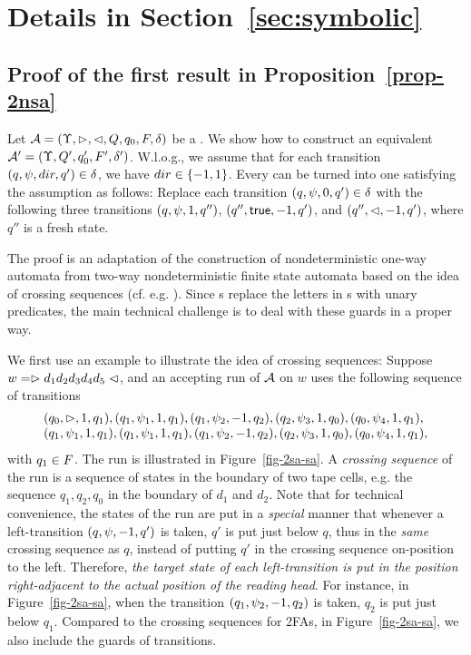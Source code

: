 \section{Details in Section~\ref{sec:symbolic}}\label{app-sym}

\subsection{Proof of the first result in Proposition~\ref{prop-2nsa}}

Let $\mathcal{A} = (\Upsilon, \vartriangleright, \vartriangleleft, Q, q_0, F, \delta)$ be a \SSA. We show how to construct an equivalent \SA{} $\mathcal{A}' =  (\Upsilon, Q', q'_0, F', \delta')$.
W.l.o.g., we assume that for each transition $(q, \psi, dir, q') \in \delta$, we have $dir \in \{-1,1\}$. Every \SSA{} can be turned into one satisfying the assumption as follows: Replace each transition $(q, \psi, 0, q') \in \delta$ with the following three transitions $(q, \psi, 1, q'')$, $(q'', \mathsf{true}, -1, q')$, and $(q'', \vartriangleleft, -1, q')$, where $q''$ is a fresh state.

The proof is an adaptation of the  construction of nondeterministic one-way automata from two-way nondeterministic finite state automata based on the idea of crossing sequences (cf. e.g. \cite{HU79}). Since \SSA{}s replace the letters in \FFA{}s with unary predicates, the main technical challenge is to deal with these guards in a proper way.

We first use an example to illustrate the idea of crossing sequences: Suppose $w = \vartriangleright d_1 d_2 d_3 d_4 d_5\vartriangleleft$, and an accepting run of $\mathcal{A}$ on $w$ uses the following sequence of transitions 
\[
\begin{array}{l}
(q_0, \vartriangleright, 1, q_1), (q_1, \psi_1, 1, q_1), (q_1, \psi_2, -1, q_2), (q_2, \psi_3, 1, q_0), (q_0, \psi_4, 1, q_1), \\
(q_1, \psi_1, 1, q_1), (q_1, \psi_1, 1, q_1), (q_1, \psi_2, -1, q_2), (q_2, \psi_3, 1, q_0), (q_0, \psi_4, 1, q_1),
\end{array}
\] 
with $q_1 \in F$.
The run is illustrated in Figure~\ref{fig-2sa-sa}. A \emph{crossing sequence} of the run is a sequence of states in the boundary of two tape cells, e.g. the sequence $q_1, q_2, q_0$ in the boundary of $d_1$ and $d_2$. Note that for technical convenience, the states of the run are put in a \emph{special} manner that whenever a left-transition $(q, \psi, -1, q')$ is taken, $q'$ is put just below $q$, thus in the \emph{same} crossing sequence as $q$, instead of putting $q'$ in the crossing sequence on-position to the left. Therefore, 
\emph{the target state of each left-transition is put in the position right-adjacent to the actual position of the reading head}.
For instance, in Figure~\ref{fig-2sa-sa}, when the transition $(q_1, \psi_2, -1, q_2)$ is taken, $q_2$ is put just below $q_1$. Compared to the crossing sequences for 2FAs, in Figure~\ref{fig-2sa-sa}, we also include the guards of transitions. 

